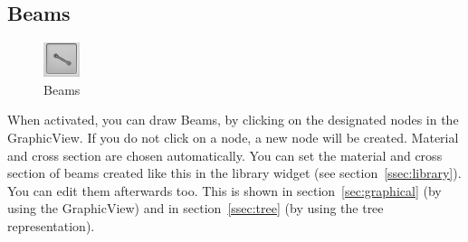 \documentclass[a4paper,11pt]{report}
\begin{document}
\subsection{Beams}
\begin{minipage}[h]{4cm}
\begin{figure}[H]
\begin{center}
\includegraphics[scale=0.6]{../pictures/beamtoolbar.png}
\caption{Beams}
\label{pic:beamtoolbar}
\end{center}
\end{figure}
\end{minipage}
\begin{minipage}[h]{\textwidth-4cm}
When activated, you can draw Beams, by clicking on the designated nodes in the GraphicView. If you do not click on a node, a new node will be created. Material and cross section are chosen automatically. You can set the material and cross section of beams created like this in the library widget (see section~\ref{ssec:library}). You can edit them afterwards too. This is shown in section~\ref{sec:graphical} (by using the GraphicView) and in section~\ref{ssec:tree} (by using the tree representation).
\end{minipage}
\end{document}
